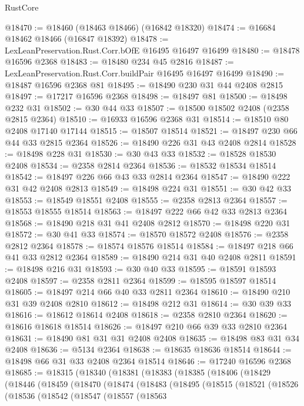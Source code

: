 \begin{lexlean}{RustCore}
\begin{coremodule}
@18470 := @18460 (@18463 @18466) (@16842 @18320)
@18474 := @16684 @18462 @18466 (@16847 @18392)
@18478 := LexLeanPreservation.Rust.Corr.bOfE @16495 @16497 @16499
@18480 := @18478 @16596 @2368
@18483 := @18480 @234 @45 @2816
@18487 := LexLeanPreservation.Rust.Corr.buildPair @16495 @16497 @16499
@18490 := @18487 @16596 @2368 @81
@18495 := @18490 @230 @31 @44 @2408 @2815
@18497 := @17217 @16596 @2368
@18498 := @18497 @81
@18500 := @18498 @232 @31
@18502 := @30 @44 @33
@18507 := @18500 @18502 @2408 (@2358 @2815 @2364)
@18510 := @16933 @16596 @2368 @31
@18514 := @18510 @80 @2408 @17140 @17144
@18515 := @18507 @18514
@18521 := @18497 @230 @66 @44 @33 @2815 @2364
@18526 := @18490 @226 @31 @43 @2408 @2814
@18528 := @18498 @228 @31
@18530 := @30 @43 @33
@18532 := @18528 @18530 @2408
@18534 := @2358 @2814 @2364
@18536 := @18532 @18534 @18514
@18542 := @18497 @226 @66 @43 @33 @2814 @2364
@18547 := @18490 @222 @31 @42 @2408 @2813
@18549 := @18498 @224 @31
@18551 := @30 @42 @33
@18553 := @18549 @18551 @2408
@18555 := @2358 @2813 @2364
@18557 := @18553 @18555 @18514
@18563 := @18497 @222 @66 @42 @33 @2813 @2364
@18568 := @18490 @218 @31 @41 @2408 @2812
@18570 := @18498 @220 @31
@18572 := @30 @41 @33
@18574 := @18570 @18572 @2408
@18576 := @2358 @2812 @2364
@18578 := @18574 @18576 @18514
@18584 := @18497 @218 @66 @41 @33 @2812 @2364
@18589 := @18490 @214 @31 @40 @2408 @2811
@18591 := @18498 @216 @31
@18593 := @30 @40 @33
@18595 := @18591 @18593 @2408
@18597 := @2358 @2811 @2364
@18599 := @18595 @18597 @18514
@18605 := @18497 @214 @66 @40 @33 @2811 @2364
@18610 := @18490 @210 @31 @39 @2408 @2810
@18612 := @18498 @212 @31
@18614 := @30 @39 @33
@18616 := @18612 @18614 @2408
@18618 := @2358 @2810 @2364
@18620 := @18616 @18618 @18514
@18626 := @18497 @210 @66 @39 @33 @2810 @2364
@18631 := @18490 @81 @31 @31 @2408 @2408
@18635 := @18498 @83 @31 @34 @2408
@18636 := @5134 @2364
@18638 := @18635 @18636 @18514
@18644 := @18498 @66 @31 @33 @2408 @2364 @18514
@18646 := @17240 @16596 @2368
@18685 := @18315
    (@18340
      (@18381
        (@18383
          (@18385
            (@18406
              (@18429
                (@18446
                  (@18459
                    (@18470
                      (@18474
                        (@18483
                          (@18495
                            (@18515
                              (@18521
                                (@18526
                                  (@18536
                                    (@18542
                                      (@18547
                                        (@18557
                                          (@18563

\end{coremodule}
\end{lexlean}
